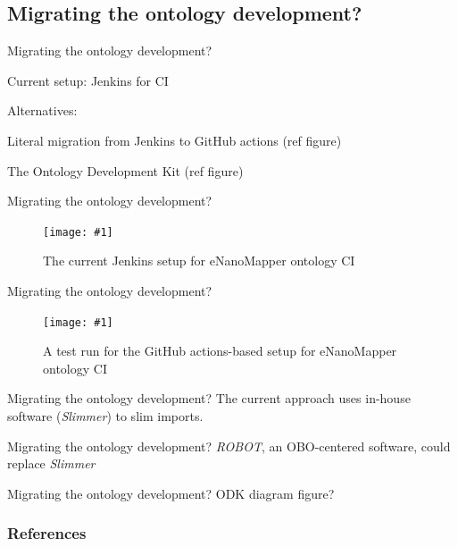\documentclass[english, xcolor=dvipsnames, aspectratio=169]{beamer}
\newcommand{\subitem}[1]{
    {\setlength\itemindent{15pt} \item[-] #1}
}
\newcommand{\includefiguremediumlarger}[2]
{
    \begin{figure}[h]
    \caption{#2}
    \centering
    \texttt{[image: \#1]}
    \end{figure}
}
\newcommand{\subsectiontitle}{}
\begin{document}
% 
\renewcommand{\subsectiontitle}{Migrating the ontology development?}
\subsection{\subsectiontitle}
\begin{frame}{\subsectiontitle}
\begin{itemize}
    \item Current setup: Jenkins for CI
    \item Alternatives:
        \subitem{Literal migration from Jenkins to GitHub actions (ref figure)}
        \subitem{The Ontology Development Kit (ref figure)}
\end{itemize}
\end{frame}

% 

\begin{frame}{\subsectiontitle}
\centering
\includefiguremediumlarger{jenkins.pdf}{The current Jenkins setup for eNanoMapper ontology CI}
\end{frame}

% 

\begin{frame}{\subsectiontitle}
\centering
\includefiguremediumlarger{ghactionsrun.pdf}{A test run for the GitHub actions-based setup for eNanoMapper ontology CI}
\end{frame}


% 

\begin{frame}{\subsectiontitle}
\centering
    The current approach uses in-house software (\textit{Slimmer}) to slim imports.
\end{frame}

% 
\begin{frame}{\subsectiontitle}
\centering
    \textit{ROBOT}, an OBO-centered software, could replace \textit{Slimmer}


\end{frame}
% 
\begin{frame}{\subsectiontitle}
\centering
ODK diagram figure?
\end{frame}

\begin{frame}[t, allowframebreaks]
\frametitle{References}

\end{frame}
\end{document}
